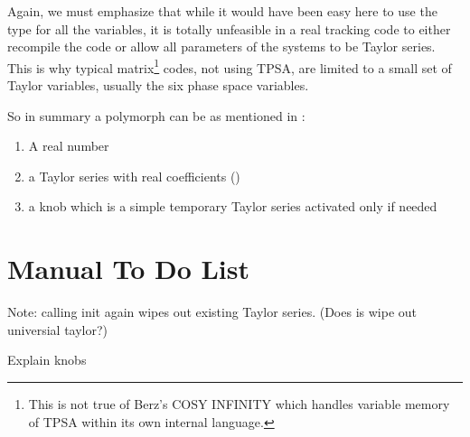 \documentclass{hitec}     %
\newcommand{\Section}[1]{\section{#1}\vspace*{-1ex}}
\begin{document}
Again, we must emphasize that while it would have been easy here to use the type  for all the variables, it is totally unfeasible in a real tracking code to either recompile the code or allow all parameters of the systems to be Taylor series. This is why typical matrix\footnote{This is not true of Berz's COSY INFINITY which handles variable memory of TPSA within its own internal language.} codes, not using TPSA, are limited to a small set of Taylor variables, usually the six phase space variables.

So in summary a  polymorph can be as mentioned in :

\begin{enumerate}
 \item A real number
 \item a Taylor series with real coefficients ()
 \item a knob which is a simple temporary Taylor series activated only if needed
\end{enumerate}

\Section{Manual To Do List}


Note: calling init again wipes out existing Taylor series. (Does is wipe out universial taylor?)

Explain knobs
\end{document}
